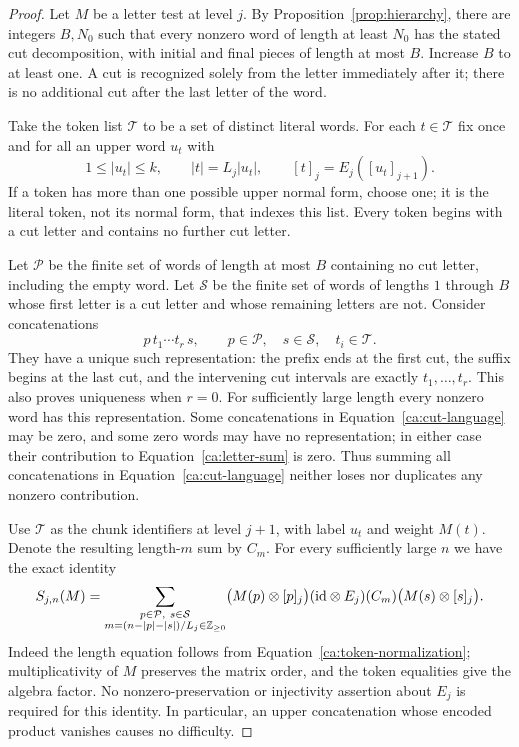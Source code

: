\begin{proof}
Let $M$ be a letter test at level $j$.  By
Proposition~\ref{prop:hierarchy}, there are integers $B,N_0$ such that
every nonzero word of length at least $N_0$ has the stated cut
decomposition, with initial and final pieces of length at most $B$.
Increase $B$ to at least one.  A cut is recognized solely from the letter
immediately after it; there is no additional cut after the last letter of
the word.

Take the token list $\mathcal T$ to be a set of distinct literal words.
For each $t\in\mathcal T$ fix once and for all an upper word $u_t$ with
\begin{equation}
  1\leq |u_t|\leq k,\qquad
  |t|=L_j|u_t|,\qquad [t]_j=E_j([u_t]_{j+1}).
  \label{ca:token-normalization}
\end{equation}
If a token has more than one possible upper normal form, choose one;
it is the literal token, not its normal form, that indexes this list.
Every token begins with a cut letter and contains no further cut letter.

Let $\mathcal P$ be the finite set of words of length at most $B$ containing
no cut letter, including the empty word.  Let $\mathcal S$ be the finite
set of words of lengths $1$ through $B$ whose first letter is a cut letter
and whose remaining letters are not.  Consider concatenations
\begin{equation}
  p\,t_1\cdots t_r\,s,
  \qquad p\in\mathcal P,\quad s\in\mathcal S,\quad t_i\in\mathcal T.
  \label{ca:cut-language}
\end{equation}
They have a unique such representation: the prefix ends at the first cut,
the suffix begins at the last cut, and the intervening cut intervals are
exactly $t_1,\ldots,t_r$.  This also proves uniqueness when $r=0$.
For sufficiently large length every nonzero word has this representation.
Some concatenations in Equation~\eqref{ca:cut-language} may be zero, and
some zero words may have no representation; in either case their
contribution to Equation~\eqref{ca:letter-sum} is zero.  Thus summing all
concatenations in Equation~\eqref{ca:cut-language} neither loses nor
duplicates any nonzero contribution.

Use $\mathcal T$ as the chunk identifiers at level $j+1$, with label
$u_t$ and weight $M(t)$.  Denote the resulting length-$m$ sum by $C_m$.
For every sufficiently large $n$ we have the exact identity
\begin{equation}
  S_{j,n}(M)=
  \sum_{\substack{p\in\mathcal P,\ s\in\mathcal S\\
       m=(n-|p|-|s|)/L_j\in\mathbb Z_{\geq0}}}
  \bigl(M(p)\otimes[p]_j\bigr)
  (\mathrm{id}\otimes E_j)(C_m)
  \bigl(M(s)\otimes[s]_j\bigr).
  \label{ca:cut-identity}
\end{equation}
Indeed the length equation follows from
Equation~\eqref{ca:token-normalization}; multiplicativity of $M$ preserves
the matrix order, and the token equalities give the algebra factor.
No nonzero-preservation or injectivity assertion about $E_j$ is required
for this identity.  In particular, an upper concatenation whose encoded
product vanishes causes no difficulty.


\end{proof}
